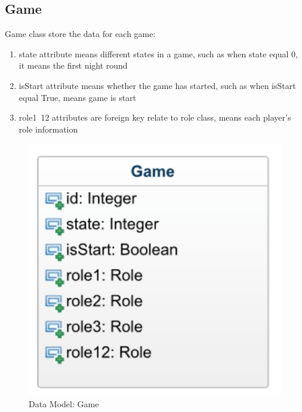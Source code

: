 \documentclass[11pt]{article}
\begin{document}
\subsection{Game}
Game class store the data for each game:
\begin{enumerate}
\item
state attribute means different states in a game, such as when state equal 0, it means the first night round
\item
isStart attribute means whether the game has started, such as when isStart equal True, means game is start 
\item
role1~12 attributes are foreign key relate to role class, means each player’s role information
\end{enumerate}

\begin{figure}
\centering
\begin{minipage}{.5\linewidth}
\centering
\includegraphics[width=0.9\linewidth, keepaspectratio]{model-game.png}
\caption{Data Model: Game}
\label{fig:func-gamenight}
\end{minipage}%
\begin{minipage}{.5\linewidth}
\centering

\end{minipage}
\end{figure}
\end{document}

